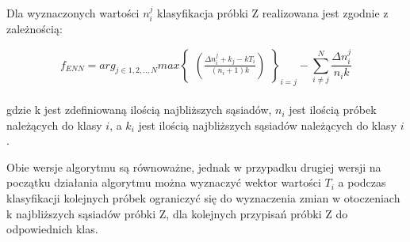 Dla wyznaczonych wartości $n_i^j$ klasyfikacja próbki Z realizowana jest zgodnie z zależnością:

\begin{equation}
f_{ENN} = arg_{j \in 1,2,..,N} max \begin{Bmatrix}
(\frac{\Delta n_i^j + k_j -kT_i}{(n_i+1)k})
\end{Bmatrix}_{i=j} - \sum_{i \neq j}^N \frac{\Delta n_i^j}{n_i k}
\end{equation}\\
gdzie k jest zdefiniowaną ilością najbliższych sąsiadów, $n_i$ jest ilością próbek należących do klasy $i$, a $k_i$ jest ilością najbliższych sąsiadów należących do klasy $i$.

Obie wersje algorytmu są równoważne, jednak w przypadku drugiej wersji na początku działania algorytmu można wyznaczyć wektor wartości $T_i$ a podczas klasyfikacji kolejnych próbek ograniczyć się do wyznaczenia zmian w otoczeniach k najbliższych sąsiadów próbki Z, dla kolejnych przypisań próbki Z do odpowiednich klas.

